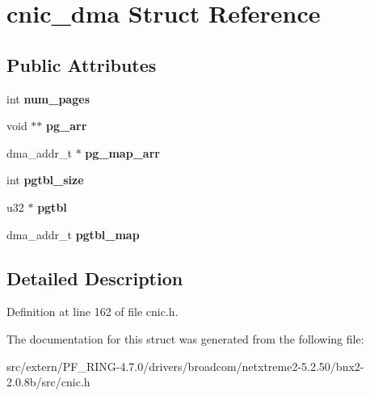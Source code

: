 \hypertarget{structcnic__dma}{
\section{cnic\_\-dma Struct Reference}
\label{structcnic__dma}
}
\subsection*{Public Attributes}
\begin{DoxyCompactItemize}
\item 
\hypertarget{structcnic__dma_aa9707d763de2c899e4916c0018f1ba82}{
int {\bfseries num\_\-pages}}
\label{structcnic__dma_aa9707d763de2c899e4916c0018f1ba82}

\item 
\hypertarget{structcnic__dma_ae52c7dbf2c16af16b4e0aa36190a541d}{
void $\ast$$\ast$ {\bfseries pg\_\-arr}}
\label{structcnic__dma_ae52c7dbf2c16af16b4e0aa36190a541d}

\item 
\hypertarget{structcnic__dma_a02894ccc112510b7ee7d87f0752682f9}{
dma\_\-addr\_\-t $\ast$ {\bfseries pg\_\-map\_\-arr}}
\label{structcnic__dma_a02894ccc112510b7ee7d87f0752682f9}

\item 
\hypertarget{structcnic__dma_a8299bf5c50e1a8d7252b15d3a270518f}{
int {\bfseries pgtbl\_\-size}}
\label{structcnic__dma_a8299bf5c50e1a8d7252b15d3a270518f}

\item 
\hypertarget{structcnic__dma_a118b46cad0aa5bbe505bda606197ec54}{
u32 $\ast$ {\bfseries pgtbl}}
\label{structcnic__dma_a118b46cad0aa5bbe505bda606197ec54}

\item 
\hypertarget{structcnic__dma_af110180363ab03365da260f0ab364a34}{
dma\_\-addr\_\-t {\bfseries pgtbl\_\-map}}
\label{structcnic__dma_af110180363ab03365da260f0ab364a34}

\end{DoxyCompactItemize}


\subsection{Detailed Description}


Definition at line 162 of file cnic.h.



The documentation for this struct was generated from the following file:\begin{DoxyCompactItemize}
\item 
src/extern/PF\_\-RING-\/4.7.0/drivers/broadcom/netxtreme2-\/5.2.50/bnx2-\/2.0.8b/src/cnic.h\end{DoxyCompactItemize}
